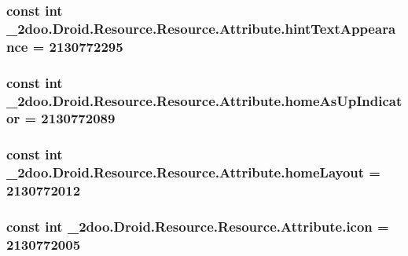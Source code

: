 \hypertarget{class__2doo_1_1_droid_1_1_resource_1_1_attribute_8d87982913d9b1e8e599759756f1bcf2}{
\subsubsection[{hintTextAppearance}]{\setlength{\rightskip}{0pt plus 5cm}const int \_\-2doo.Droid.Resource.Resource.Attribute.hintTextAppearance = 2130772295}}
\label{class__2doo_1_1_droid_1_1_resource_1_1_attribute_8d87982913d9b1e8e599759756f1bcf2}


\hypertarget{class__2doo_1_1_droid_1_1_resource_1_1_attribute_f463194fd8f084bafe68fb5c23827869}{
\subsubsection[{homeAsUpIndicator}]{\setlength{\rightskip}{0pt plus 5cm}const int \_\-2doo.Droid.Resource.Resource.Attribute.homeAsUpIndicator = 2130772089}}
\label{class__2doo_1_1_droid_1_1_resource_1_1_attribute_f463194fd8f084bafe68fb5c23827869}


\hypertarget{class__2doo_1_1_droid_1_1_resource_1_1_attribute_73a028a6c5810aff3d11dbb3e618f8bf}{
\subsubsection[{homeLayout}]{\setlength{\rightskip}{0pt plus 5cm}const int \_\-2doo.Droid.Resource.Resource.Attribute.homeLayout = 2130772012}}
\label{class__2doo_1_1_droid_1_1_resource_1_1_attribute_73a028a6c5810aff3d11dbb3e618f8bf}


\hypertarget{class__2doo_1_1_droid_1_1_resource_1_1_attribute_01a2d291eb7c9b3b0ed3143f37b647f2}{
\subsubsection[{icon}]{\setlength{\rightskip}{0pt plus 5cm}const int \_\-2doo.Droid.Resource.Resource.Attribute.icon = 2130772005}}
\label{class__2doo_1_1_droid_1_1_resource_1_1_attribute_01a2d291eb7c9b3b0ed3143f37b647f2}


